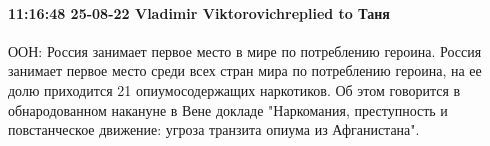  
 
 
 
 

\paragraph{11:16:48 25-08-22 Vladimir Viktorovichreplied to Таня}

ООН: Россия занимает первое место в мире по потреблению героина.
Россия занимает первое место среди всех стран мира по потреблению героина, на
ее долю приходится 21%
опиумосодержащих наркотиков. Об этом говорится в обнародованном накануне в Вене
докладе "Наркомания, преступность и повстанческое движение: угроза транзита
опиума из Афганистана".


